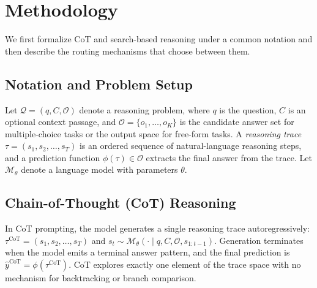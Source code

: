 \documentclass{article}
\begin{document}

\section{Methodology}
\label{sec:method}

We first formalize CoT and search-based reasoning under a common notation and then describe the routing mechanisms that choose between them.

\subsection{Notation and Problem Setup}
\label{sec:notation}

Let $\mathcal{Q} = (q, C, \mathcal{O})$ denote a reasoning problem, where $q$ is the question, $C$ is an optional context passage, and $\mathcal{O} = \{o_1, \ldots, o_K\}$ is the candidate answer set for multiple-choice tasks or the output space for free-form tasks. A \emph{reasoning trace} $\tau = (s_1, s_2, \ldots, s_T)$ is an ordered sequence of natural-language reasoning steps, and a prediction function $\phi(\tau) \in \mathcal{O}$ extracts the final answer from the trace. Let $\mathcal{M}_\theta$ denote a language model with parameters $\theta$.

\subsection{Chain-of-Thought (CoT) Reasoning}
\label{sec:cot}

In CoT prompting, the model generates a single reasoning trace autoregressively: $\tau^{\text{CoT}} = (s_1, s_2, \ldots, s_T)$ and $s_t \sim \mathcal{M}_\theta(\cdot \mid q, C, \mathcal{O}, s_{1:t-1})$.
Generation terminates when the model emits a terminal answer pattern, and the final prediction is $\hat{y}^{\text{CoT}} = \phi(\tau^{\text{CoT}})$. CoT explores exactly one element of the trace space with no mechanism for backtracking or branch comparison.
\end{document}
